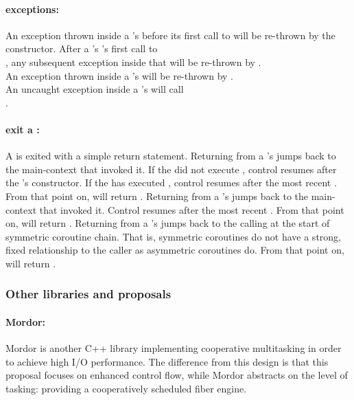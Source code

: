\paragraph*{exceptions:}
An exception thrown inside a \pullcoro's \corofunction before its first call to
\pushcoroop will be re-thrown by the \pullcoro constructor. After a \pullcoro's
\corofunction's first call to\\
\pushcoroop, any subsequent exception inside that \corofunction will be
re-thrown by \pullcoroop.\\
\newline
An exception thrown inside a \pushcoro's \corofunction will be re-thrown by
\pushcoroop.\\
\newline
An uncaught exception inside a \callcoro's \corofunction will call\\
.

\paragraph*{exit a \corofunction:}
A \corofunction is exited with a simple return statement.
\newline
Returning from a \pullcoro's \corofunction jumps back to the main-context that
invoked it. If the \corofunction did not execute \pushcoroop, control resumes
after the \pullcoro's constructor. If the \corofunction has
executed \pushcoroop, control resumes after the most recent \pullcoroop. From
that point on, \pullcorobool will return .
\newline
Returning from a \pushcoro's \corofunction jumps back to the main-context that
invoked it. Control resumes after the most recent \pushcoroop. From that point
on, \pushcorobool will return .
\newline
Returning from a \callcoro's \corofunction jumps back to the
calling \callcoroop at the start of symmetric coroutine chain. That is,
symmetric coroutines do not have a strong, fixed relationship to the caller as
asymmetric coroutines do. From that point on, \callcorobool will
return .


\subsubsection*{Other libraries and proposals}
\paragraph*{Mordor:}
Mordor\cite{mordor} is another C++ library implementing cooperative multitasking
in order to achieve high I/O performance. The difference from this design is
that this proposal focuses on enhanced control flow, while Mordor\cite{mordor}
abstracts on the level of tasking: providing a cooperatively scheduled fiber
engine.

